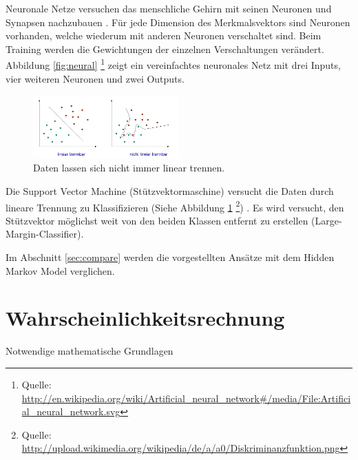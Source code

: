 Neuronale Netze versuchen das menschliche Gehirn mit seinen Neuronen und Synapsen nachzubauen \cite{neuron}. Für jede Dimension des Merkmalsvektors sind Neuronen vorhanden, welche wiederum mit anderen Neuronen verschaltet sind. Beim Training werden die Gewichtungen der einzelnen Verschaltungen verändert.
Abbildung \ref{fig:neural} \footnote{Quelle: \url{http://en.wikipedia.org/wiki/Artificial_neural_network\#/media/File:Artificial_neural_network.svg}} zeigt ein vereinfachtes neuronales Netz mit drei Inputs, vier weiteren Neuronen und zwei Outputs.

\begin{figure}[htbp] \centering
    \includegraphics[width=0.5\textwidth]{Bilder/Kap1/svm}
    \caption{ Daten lassen sich nicht immer linear trennen.}
    \label{fig:svm}
\end{figure}

Die Support Vector Machine (Stützvektormaschine) versucht die Daten durch lineare Trennung zu Klassifizieren (Siehe Abbildung \ref{fig:svm} \footnote{Quelle: \url{http://upload.wikimedia.org/wikipedia/de/a/a0/Diskriminanzfunktion.png}})
\cite{svm}. Es wird versucht, den Stützvektor möglichst weit von den beiden Klassen entfernt zu erstellen (Large-Margin-Classifier).


Im Abschnitt \ref{sec:compare} werden die vorgestellten Ansätze mit dem Hidden Markov Model verglichen.



\section{Wahrscheinlichkeitsrechnung}
Notwendige mathematische Grundlagen
